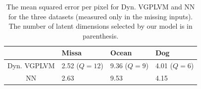 \begin{table}[h]
\caption{
\small{
  The mean squared error per pixel for Dyn. VGPLVM and NN for the three datasets (measured only in the missing inputs).
  The number of latent dimensions selected by our model is in parenthesis. 
} }
\label{videoResultsTable}
\begin{center}
\begin{tabular}{c||l|l|l}
             & Missa & Ocean & Dog \\
\hline \hline
Dyn. VGPLVM  & 2.52 ($Q = 12$) & 9.36 ($Q = 9$)  & 4.01 ($Q = 6$) \\  \hline
NN           & 2.63 & 9.53 & 4.15 \\
\end{tabular}
\end{center}
\end{table}

